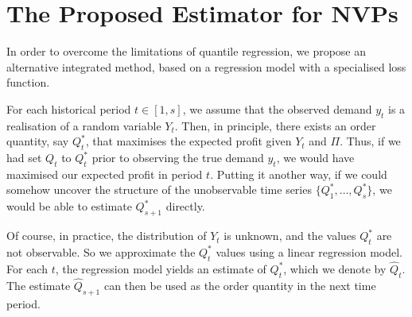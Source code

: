 \documentclass{article}
\begin{document}
\section{The Proposed Estimator for NVPs} \label{se:new}

In order to overcome the limitations of quantile regression, we propose an alternative integrated method, based on a regression model with a specialised loss function.

For each historical period $t\in [1,s]$, we assume that the observed demand $y_t$ is a realisation of a random variable $Y_t$. Then, in principle, there exists an order quantity, say $Q_t^*$, that maximises the expected profit given $Y_t$ and $\Pi$. Thus, if we had set $Q_t$ to $Q_t^*$ prior to observing the true demand $y_t$, we would have maximised our expected profit in period $t$. Putting it another way, if we could somehow uncover the structure of the unobservable time series $\big\{ Q_1^*,\dots,Q_s^* \big\}$, we would be able to estimate $Q_{s+1}^*$ directly.

Of course, in practice, the distribution of $Y_t$ is unknown, and the values $Q_t^*$ are not observable. So we approximate the $Q_t^*$ values using a linear regression model. For each $t$, the regression model yields an estimate of $Q^*_t$, which we denote by $\hat{Q}_t$. The estimate $\hat{Q}_{s+1}$ can then be used as the order quantity in the next time period.
\end{document}
